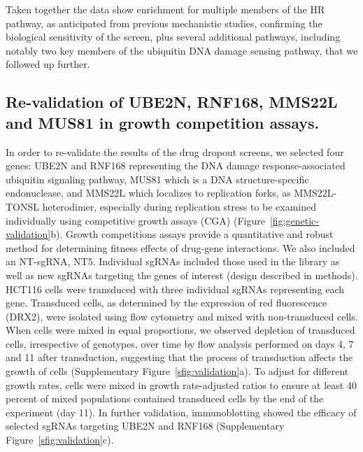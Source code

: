 Taken together the data show enrichment for multiple members of the HR pathway, as anticipated from previous mechanistic studies, confirming the biological sensitivity of the screen, plus several additional pathways, including notably two key members of the ubiquitin DNA damage sensing pathway, that we followed up further.

\subsection{Re-validation of UBE2N, RNF168, MMS22L and MUS81 in growth competition assays.}
In order to re-validate the results of the drug dropout screens, we selected four genes: UBE2N and RNF168 representing the DNA damage response-associated ubiquitin signaling pathway, MUS81 which is a DNA structure-specific endonuclease, and MMS22L which localizes to replication forks, as MMS22L-TONSL heterodimer, especially during replication stress\cite{Piwko2016} to be examined individually using competitive growth assays (CGA) (Figure~\ref{fig:genetic-validation}b).
Growth competitions assays provide a quantitative and robust method for determining fitness effects of drug-gene interactions.
We also included an NT-sgRNA, NT5. Individual sgRNAs included those used in the library as well as new sgRNAs targeting the genes of interest (design described in methods). 
HCT116 cells were transduced with three individual sgRNAs representing each gene. 
Transduced cells, as determined by the expression of red fluorescence (DRX2), were isolated using flow cytometry and mixed with non-transduced cells. 
When cells were mixed in equal proportions, we observed depletion of transduced cells, irrespective of genotypes, over time by flow analysis performed on days 4, 7 and 11 after transduction, suggesting that the process of transduction affects the growth of cells (Supplementary Figure~\ref{sfig:validation}a). 
To adjust for different growth rates, cells were mixed in growth rate-adjusted ratios to ensure at least 40 percent of mixed populations contained transduced cells by the end of the experiment (day 11). 
In further validation, immunoblotting showed the efficacy of selected sgRNAs targeting UBE2N and RNF168 (Supplementary Figure~\ref{sfig:validation}c).

